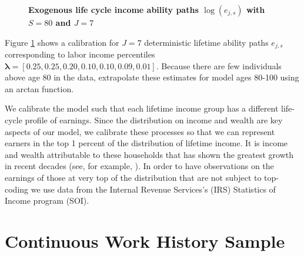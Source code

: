 \begin{figure}[htbp]\centering \captionsetup{width=4.0in}
  \caption{\label{FigLogAbil}\textbf{Exogenous life cycle income ability paths $\log(e_{j,s})$ with $S=80$ and $J=7$}}
\end{figure}

Figure \ref{FigLogAbil} shows a calibration for $J=7$ deterministic lifetime ability paths $e_{j,s}$ corresponding to labor income percentiles $\bm{\lambda}=[0.25, 0.25, 0.20, 0.10, 0.10, 0.09, 0.01]$. Because there are few individuals above age 80 in the data, \citet{DeBackerEtAl:2017b} extrapolate these estimates for model ages 80-100 using an arctan function.

We calibrate the model such that each lifetime income group has a different life-cycle profile of earnings. Since the distribution on income and wealth are key aspects of our model, we calibrate these processes so that we can represent earners in the top 1 percent of the distribution of lifetime income. It is income and wealth attributable to these households that has shown the greatest growth in recent decades (see, for example, \citet{PikettySaez:2003}). In order to have observations on the earnings of those at very top of the distribution that are not subject to top-coding we use data from the Internal Revenue Services's (IRS) Statistics of Income program (SOI).


\section{Continuous Work History Sample}\label{SecLFEarnCWHS}

